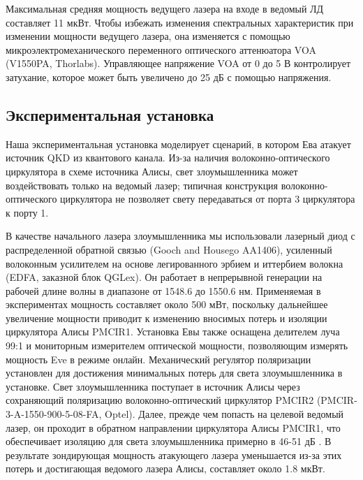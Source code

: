 Максимальная средняя мощность ведущего лазера на входе в ведомый ЛД составляет 11 мкВт. Чтобы избежать изменения спектральных характеристик при изменении мощности ведущего лазера, она изменяется с помощью микроэлектромеханического переменного оптического аттенюатора VOA (V1550PA, Thorlabs). Управляющее напряжение VOA от 0 до 5 В контролирует затухание, которое может быть увеличено до 25 дБ с помощью напряжения. 

\subsection{Экспериментальная установка}

Наша экспериментальная установка моделирует сценарий, в котором Ева атакует источник QKD из квантового канала. Из-за наличия волоконно-оптического циркулятора в схеме источника Алисы, свет злоумышленника может воздействовать только на ведомый лазер; типичная конструкция волоконно-оптического циркулятора не позволяет свету передаваться от порта 3 циркулятора к порту 1.

В качестве начального лазера злоумышленника мы использовали лазерный диод с распределенной обратной связью (Gooch and Housego AA1406), усиленный волоконным усилителем на основе легированного эрбием и иттербием волокна (EDFA, заказной блок QGLex)\cite{huang2020}. Он работает в непрерывной генерации на рабочей длине волны в диапазоне от 1548.6 до 1550.6 нм. Применяемая в экспериментах мощность составляет около 500 мВт, поскольку дальнейшее увеличение мощности приводит к изменению вносимых потерь и изоляции циркулятора Алисы PMCIR1. Установка Евы также оснащена делителем луча 99:1 и мониторным измерителем оптической мощности, позволяющим измерять мощность Eve в режиме онлайн. Механический регулятор поляризации установлен для достижения минимальных потерь для света злоумышленника в установке. Свет злоумышленника поступает в источник Алисы через сохраняющий поляризацию волоконно-оптический циркулятор PMCIR2 (PMCIR-3-A-1550-900-5-08-FA, Optel). Далее, прежде чем попасть на целевой ведомый лазер, он проходит в обратном направлении циркулятора Алисы PMCIR1, что обеспечивает изоляцию для света злоумышленника примерно в 46-51 дБ . В результате зондирующая мощность атакующего лазера уменьшается из-за этих потерь и достигающая ведомого лазера Алисы, составляет около 1.8 мкВт.


